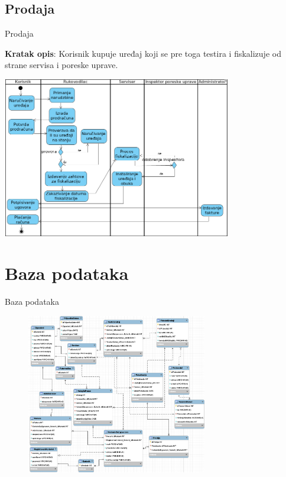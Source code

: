 \documentclass[9pt]{beamer}
\begin{document}
\subsection{Prodaja}
\begin{frame}{Prodaja}
    \begin{center}
    \small{\vspace*{-0.1cm}
    \textbf{Kratak opis}: Korisnik kupuje uređaj koji se pre toga testira i fiskalizuje od strane servisa i poreske uprave.}
    \end{center}
    \vspace*{-0.3cm}
    \begin{center}
        \includegraphics[width=10cm, height=7cm]{assets/DijagramAktivnostiProdaje.png}
    \end{center}
\end{frame}

\section{Baza podataka}
\begin{frame}{Baza podataka}
    \begin{center}
        \includegraphics[width=10cm, height=7cm]{assets/bp4.png}
    \end{center}
\end{frame}
\end{document}
